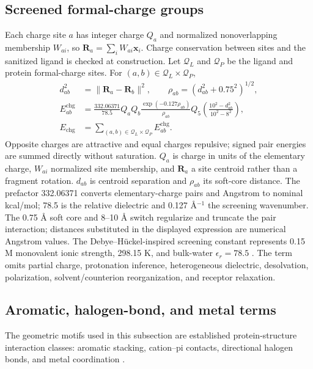 \documentclass{article}
\newcommand{\citep}[1]{\cite{#1}}
\begin{document}
\subsection{Screened formal-charge groups}

Each charge site \(a\) has integer charge \(Q_a\) and normalized nonoverlapping membership \(W_{ai}\), so \(\mathbf{R}_a=\sum_iW_{ai}\mathbf{x}_i\).
Charge conservation between sites and the sanitized ligand is checked at construction.
Let \(\mathcal Q_L\) and \(\mathcal Q_P\) be the ligand and protein formal-charge sites.
For \((a,b)\in\mathcal Q_L\times\mathcal Q_P\),
\begin{align}
    d_{ab}^2&=\|\mathbf{R}_a-\mathbf{R}_b\|^2,\qquad
    \rho_{ab}=(d_{ab}^2+0.75^2)^{1/2},\\
    E_{ab}^{\mathrm{chg}}
    &=\frac{332.06371}{78.5}Q_aQ_b
      \frac{\exp(-0.127\rho_{ab})}{\rho_{ab}}
      Q_5\left(\frac{10^2-d_{ab}^2}{10^2-8^2}\right),\\
    E_{\mathrm{chg}}
    &=\sum_{(a,b)\in\mathcal Q_L\times\mathcal Q_P}
      E_{ab}^{\mathrm{chg}}.
    \label{eq:si_screened_charge}
\end{align}
Opposite charges are attractive and equal charges repulsive; signed pair energies are summed directly without saturation.
\(Q_a\) is charge in units of the elementary charge, \(W_{ai}\) normalized site membership, and \(\mathbf R_a\) a site centroid rather than a fragment rotation. \(d_{ab}\) is centroid separation and \(\rho_{ab}\) its soft-core distance. The prefactor 332.06371 converts elementary-charge pairs and Angstrom to nominal kcal/mol; 78.5 is the relative dielectric and 0.127 Å\(^{-1}\) the screening wavenumber. The 0.75 Å soft core and 8--10 Å switch regularize and truncate the pair interaction; distances substituted in the displayed expression are numerical Angstrom values.
The Debye--H\"uckel-inspired screening constant represents 0.15 M monovalent ionic strength, 298.15 K, and bulk-water \(\epsilon_r=78.5\) \citep{lee2002electrostatic}.
The term omits partial charge, protonation inference, heterogeneous dielectric, desolvation, polarization, solvent/counterion reorganization, and receptor relaxation.

\subsection{Aromatic, halogen-bond, and metal terms}

The geometric motifs used in this subsection are established protein-structure interaction classes: aromatic stacking, cation--pi contacts, directional halogen bonds, and metal coordination \citep{mcgaughey1998pistacking,gallivan1999cationpi,auffinger2004halogen,desiraju2013halogen,dokmanic2008metals,bazayeva2024metal,lin2024mespeus}.
\end{document}
